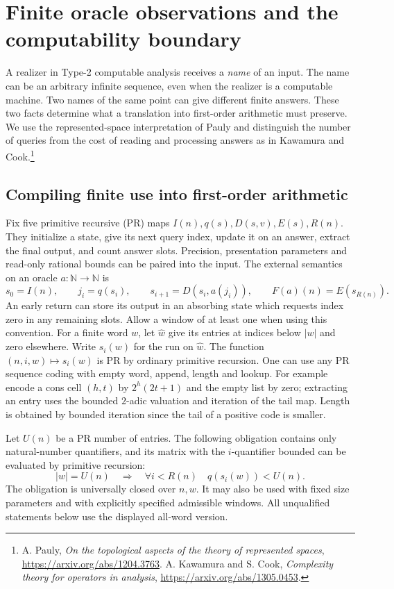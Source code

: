 \section{Finite oracle observations and the computability boundary}
\label{sec:oracle}

A realizer in Type-2 computable analysis receives a \emph{name} of an input.
The name can be an arbitrary infinite sequence, even when the realizer is a
computable machine. Two names of the same point can give different finite
answers. These two facts determine what a translation into first-order arithmetic
must preserve. We use the represented-space interpretation of Pauly and distinguish
the number of queries from the cost of reading and processing answers as in
Kawamura and Cook.\footnote{A. Pauly, \emph{On the topological aspects of the
theory of represented spaces}, \url{https://arxiv.org/abs/1204.3763}.
A. Kawamura and S. Cook, \emph{Complexity theory for operators in analysis},
\url{https://arxiv.org/abs/1305.0453}.}

\subsection{Compiling finite use into first-order arithmetic}

Fix five primitive recursive (PR) maps $I(n),q(s),D(s,v),E(s),R(n)$.
They initialize a state, give its next query index, update it on an answer,
extract the final output, and count answer slots. Precision, presentation
parameters and read-only rational bounds can be paired into the input.
The external semantics on an oracle $a:\mathbb N\to\mathbb N$ is
\[
  s_0=I(n),\qquad j_i=q(s_i),\qquad s_{i+1}=D(s_i,a(j_i)),\qquad
  F(a)(n)=E(s_{R(n)}).
\]
An early return can store its output in an absorbing state which requests
index zero in any remaining slots. Allow a window of at least one when using
this convention. For a finite word $w$, let $\widehat w$ give its entries at
indices below $|w|$ and zero elsewhere. Write $s_i(w)$ for the run on
$\widehat w$. The function $(n,i,w)\mapsto s_i(w)$ is PR by ordinary
primitive recursion. One can use any PR sequence coding with empty word,
append, length and lookup. For example encode a cons cell $(h,t)$ by
$2^h(2t+1)$ and the empty list by zero; extracting an entry uses the
bounded $2$-adic valuation and iteration of the tail map. Length is obtained
by bounded iteration since the tail of a positive code is smaller.

Let $U(n)$ be a PR number of entries. The following obligation contains only
natural-number quantifiers, and its matrix with the $i$-quantifier bounded
can be evaluated by primitive recursion:
\begin{equation}
 |w|=U(n)\quad\Longrightarrow\quad
 \forall i<R(n)\quad q(s_i(w))<U(n).
 \label{eq:tableguard}
\end{equation}
The obligation is universally closed over $n,w$. It may also be used with
fixed size parameters and with explicitly specified admissible windows. All
unqualified statements below use the displayed all-word version.

